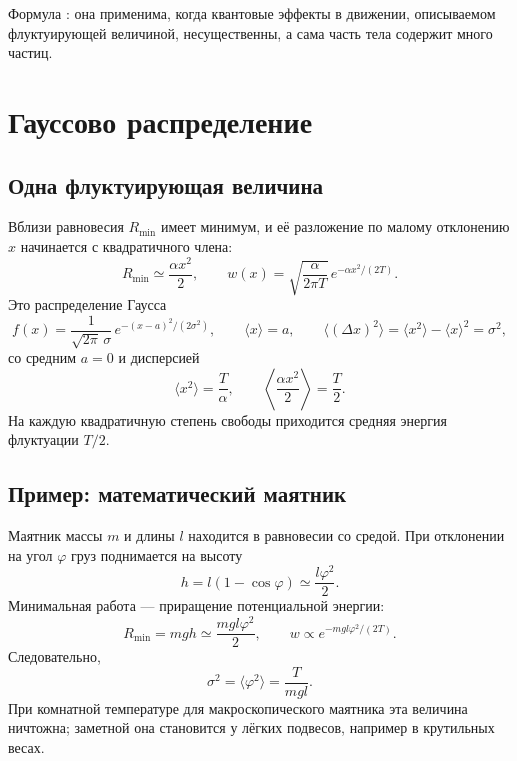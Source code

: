 \documentclass[../final.tex]{subfiles}
\begin{document}
Формула : она применима, когда квантовые эффекты
в движении, описываемом флуктуирующей величиной, несущественны,
а сама часть тела содержит много частиц.

\clearpage
\section{Гауссово распределение}
\subsection{Одна флуктуирующая величина}
Вблизи равновесия $R_{\min}$ имеет минимум, и её разложение по малому
отклонению $x$ начинается с квадратичного члена:
\begin{equation*}
 R_{\min}\simeq\frac{\alpha x^2}{2},\qquad
 w(x)=\sqrt{\frac{\alpha}{2\pi T}}\,e^{-\alpha x^2/(2T)}.
\end{equation*}
Это распределение Гаусса
\begin{equation*}
 f(x)=\frac1{\sqrt{2\pi}\,\sigma}\,e^{-(x-a)^2/(2\sigma^2)},\qquad
 \langle x\rangle=a,\qquad
 \langle(\Delta x)^2\rangle=\langle x^2\rangle-\langle x\rangle^2=\sigma^2,
\end{equation*}
со средним $a=0$ и дисперсией
\begin{equation*}
 \langle x^2\rangle=\frac{T}{\alpha},\qquad
 \left\langle\frac{\alpha x^2}{2}\right\rangle=\frac T2.
\end{equation*}
На каждую квадратичную степень свободы приходится средняя энергия
флуктуации $T/2$.

\subsection{Пример: математический маятник}
Маятник массы $m$ и длины $l$ находится в равновесии со средой.
При отклонении на угол $\varphi$ груз поднимается на высоту
\begin{equation*}
 h=l(1-\cos\varphi)\simeq\frac{l\varphi^2}{2}.
\end{equation*}
Минимальная работа --- приращение потенциальной энергии:
\begin{equation*}
 R_{\min}=mgh\simeq\frac{mgl\varphi^2}{2},\qquad
 w\propto e^{-mgl\varphi^2/(2T)}.
\end{equation*}
Следовательно,
\begin{equation*}
 \sigma^2=\langle\varphi^2\rangle=\frac{T}{mgl}.
\end{equation*}
При комнатной температуре для макроскопического маятника эта величина
ничтожна; заметной она становится у лёгких подвесов, например в крутильных весах.
\end{document}
